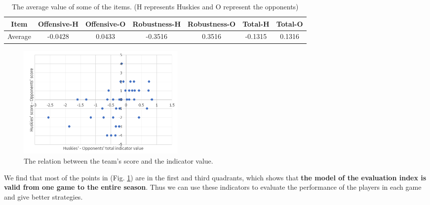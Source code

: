 \documentclass{mcmthesis}
\begin{document}
\begin{table}[htbp]
	\centering
	\label{table:teamwork_indicator}
	\caption{The average value of some of the items. (H represents Huskies and O represent the opponents)}
	\begin{tabular}{ccccccc}
	\toprule
	Item & Offensive-H &Offensive-O&Robustness-H&Robustness-O&Total-H&Total-O\\
	\midrule
	Average &-0.0428&0.0433&-0.3516&0.3516&-0.1315&0.1316\\ 
	\bottomrule
	\end{tabular}
\end{table}
\begin{figure}[htbp]
	\centering
	\includegraphics[width=0.4\textwidth]{figures/indicator_value.png}
	\caption{The relation between the team's score and the indicator value.}
	\label{fig:indicator_value}
\end{figure}

We find that most of the points in (Fig. \ref{fig:indicator_value}) are in the first and third quadrants, which shows that \textbf{the model of the evaluation index is valid from one game to the entire season}. Thus we can use these indicators to evaluate the performance of the players in each game and give better strategies.\par
\end{document}
